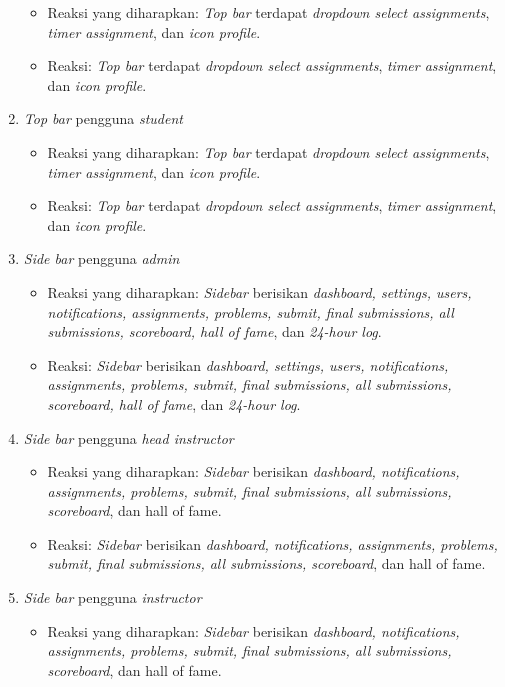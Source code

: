 \begin{enumerate}
	 \begin{itemize}
	 	\item Reaksi yang diharapkan: \textit{Top bar} terdapat \textit{dropdown select assignments}, \textit{timer assignment}, dan \textit{icon profile}.
	 	\item Reaksi: \textit{Top bar} terdapat \textit{dropdown select assignments}, \textit{timer assignment}, dan \textit{icon profile}.
	 \end{itemize}
	 \item \textit{Top bar} pengguna \textit{student}
	 \begin{itemize}
	 	\item Reaksi yang diharapkan: \textit{Top bar} terdapat \textit{dropdown select assignments}, \textit{timer assignment}, dan \textit{icon profile}.
	 	\item Reaksi: \textit{Top bar} terdapat \textit{dropdown select assignments}, \textit{timer assignment}, dan \textit{icon profile}.
	 \end{itemize}
	 \item \textit{Side bar} pengguna \textit{admin}
	 \begin{itemize}
	 	\item Reaksi yang diharapkan: \textit{Sidebar} berisikan \textit{dashboard, settings, users, notifications, assignments, problems, submit, final submissions, all submissions, scoreboard, hall of fame}, dan \textit{24-hour log}.
	 	\item Reaksi: \textit{Sidebar} berisikan \textit{dashboard, settings, users, notifications, assignments, problems, submit, final submissions, all submissions, scoreboard, hall of fame}, dan \textit{24-hour log}. 
	 \end{itemize}
	 \item \textit{Side bar} pengguna \textit{head instructor}
	 \begin{itemize}
	 	\item Reaksi yang diharapkan: \textit{Sidebar} berisikan \textit{dashboard, notifications, assignments, problems, submit, final submissions, all submissions, scoreboard}, dan hall of fame.
	 	\item Reaksi: \textit{Sidebar} berisikan \textit{dashboard, notifications, assignments, problems, submit, final submissions, all submissions, scoreboard}, dan hall of fame.
	 \end{itemize}
	 \item \textit{Side bar} pengguna \textit{instructor}
	 \begin{itemize}
	 	\item Reaksi yang diharapkan: \textit{Sidebar} berisikan \textit{dashboard, notifications, assignments, problems, submit, final submissions, all submissions, scoreboard}, dan hall of fame.

\end{itemize}
\end{enumerate}
